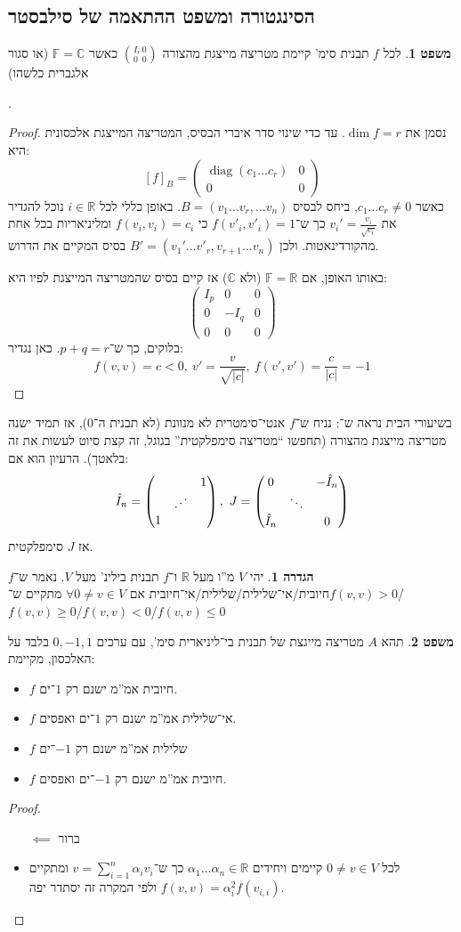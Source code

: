 \documentclass[a4paper]{article}
\newcommand\R     {\mathbb{R}}
\newcommand\C     {\mathbb{C}}
\DeclareMathOperator{\diag}    {diag}
\newcommand\F         {\mathbb{F}}
\newcommand\pms[1]    {\begin{pmatrix}
		#1
\end{pmatrix}}
\newcommand\ag        {\alpha}
\theoremstyle{definition}
\newtheorem{Theorem}{משפט}
\newtheorem{definition}{הגדרה}
\newcommand\theo  [1] {\begin{Theorem}#1\end{Theorem}}
\newcommand\defi  [1] {\begin{definition}#1\end{definition}}
\begin{document}
	
	\subsection{הסינגטורה ומשפט ההתאמה של סילבסטר}
	\theo{לכל $f$ תבנית סימ' קיימת מטריצה מייצגת מהצורה $\binom{I_r \, 0}{0 \,\,\, 0}$ כאשר $\F = \C$ (או סגור אלגברית כלשהו)}. 
	\begin{proof}
		
		נסמן את $\dim f = r$. עד כדי שינוי סדר איברי הבסיס, המטריצה המייצגת אלכסונית היא:
		\[ [f]_B = \pms{\diag(c_1 \dots c_r) & 0 \\ 0 & 0} \]
		כאשר $c_1 \dots c_r \neq 0$, ביחס לבסיס $B = (v_1 \dots v_r, \dots v_n)$. באופן כללי לכל $i \in \R$ נוכל להגדיר את $v_i' = \frac{v_i}{\sqrt{c_i}}$ כך ש־$f(v'_i, v'_i) = 1$ כי $f(v_i, v_i) = c_i$ ומליניאריות בכל אחת מהקורדינאטות. ולכן $B' = (v_1' \dots v'_r, v_{r + 1} \dots v_n)$ בסיס המקיים את הדרוש. 
		
		באותו האופן, אם $\F = \R$ (ולא $\C$) אז קיים בסיס שהמטריצה המייצגת לפיו היא: 
		\[ \pms{I_p & 0 & 0 \\ 0& -I_q & 0 \\0 & 0 & 0} \]
		בלוקים, כך ש־$p + q = r$. כאן נגדיר: 
		\[ f(v, v) = c < 0, \ v' = \frac{v}{\sqrt{|c|}}, \ f(v', v') = \frac{c}{|c|} = -1 \]
	\end{proof}
	
	בשיעורי הבית נראה ש־: נניח ש־$f$ אנטי־סימטרית לא מנוונת (לא תבנית ה־$0$), אז תמיד ישנה מטריצה מייצגת מהצורה (תחפשו ``מטריצה סימפלקטית'' בגוגל, זה קצת סיוט לעשות את זה בלאטך). הרעיון הוא אם: 
	\[ \hat I_n = \pms{ && 1 \\ & \reflectbox{$\ddots$} & \\ 1}, \ J = \pms{0 & & -\hat I_n \\ & \ddots & \\ \hat I_n && 0} \]
	אז $J$ סימפלקטית. 
	
	\defi{יהי $V$ מ''ו מעל $\R$ ו־$f$ תבנית בילינ' מעל $V$. נאמר ש־$f$ חיובית/אי־שלילית/שלילית/אי־חיובית אם $\forall 0 \neq v \in V $ מתקיים ש־$f(v, v) > 0$/$f(v, v) \ge 0$/$f(v, v) < 0$/$f(v, v)\le 0$}
	
	\theo{תהא $A$ מטריצה מייגצת של תבנית בי־ליניארית סימ', עם ערכים $0, -1, 1$ בלבד על האלכסון, מקיימת: 
		\begin{itemize}
			\item $f$ חיובית אמ''מ ישנם רק $1$־ים. 
			\item $f$ אי־שלילית אמ''מ ישנם רק $1$־ים ואפסים. 
			\item $f$ שלילית אמ''מ ישנם רק $-1$־ים
			\item $f$ חיובית אמ''מ ישנם רק $-1$־ים ואפסים. 
	\end{itemize}}
	\begin{proof}\,
		\begin{itemize}
			\item[$\impliedby$] ברור
			\item לכל $0 \neq v \in V$ קיימים ויחידים $\ag_1 \dots \ag_n \in \R$ כך ש־$v = \sum^n_{i = 1} \ag_i v_i$ ומתקיים $f(v, v) = \ag_i^2 f(v_{i, i})$ ולפי המקרה זה יסתדר יפה. 
		\end{itemize}
	\end{proof}
	
\end{document}
